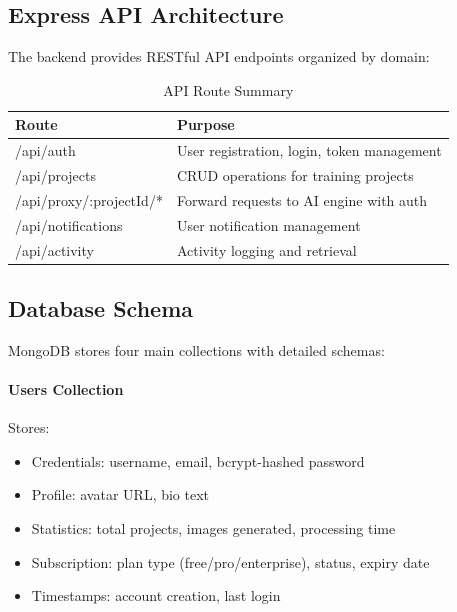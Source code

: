 \documentclass[11pt,a4paper]{article}
\begin{document}
\subsection{Express API Architecture}
The backend provides RESTful API endpoints organized by domain:

\begin{table}[H]
\centering
\small
\begin{tabular}{lp{8cm}}
\toprule
\textbf{Route} & \textbf{Purpose} \\
\midrule
/api/auth & User registration, login, token management \\
/api/projects & CRUD operations for training projects \\
/api/proxy/:projectId/* & Forward requests to AI engine with auth \\
/api/notifications & User notification management \\
/api/activity & Activity logging and retrieval \\
\bottomrule
\end{tabular}
\caption{API Route Summary}
\end{table}

\subsection{Database Schema}
MongoDB stores four main collections with detailed schemas:

\paragraph{Users Collection} Stores:
\begin{itemize}[noitemsep]
    \item Credentials: username, email, bcrypt-hashed password
    \item Profile: avatar URL, bio text
    \item Statistics: total projects, images generated, processing time
    \item Subscription: plan type (free/pro/enterprise), status, expiry date
    \item Timestamps: account creation, last login
\end{itemize}
\end{document}

